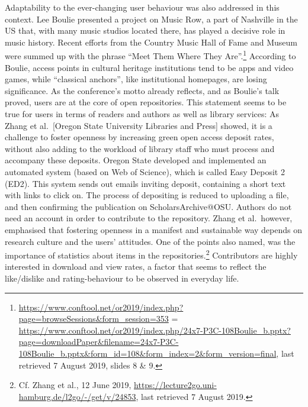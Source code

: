 \documentclass[a4paper,
fontsize=11pt,
oneside,
numbers=noperiodatend,
parskip=half-,
bibliography=totoc,
final
]{scrartcl}
\begin{document}
Adaptability to the ever-changing user behaviour was also addressed in
this context. Lee Boulie presented a project on Music Row, a part of
Nashville in the US that, with many music studios located there, has
played a decisive role in music history. Recent efforts from the Country
Music Hall of Fame and Museum were summed up with the phrase
\enquote{Meet Them Where They Are}.\footnote{\url{https://www.conftool.net/or2019/index.php?page=browseSessions&form_session=353} = \url{https://www.conftool.net/or2019/index.php/24x7-P3C-108Boulie_b.pptx?page=downloadPaper\&filename=24x7-P3C-108Boulie_b.pptx\&form_id=108\&form_index=2\&form_version=final}, last retrieved 7 August 2019, slides 8 \& 9.} According to Boulie,
access points in cultural heritage institutions tend to be apps and
video games, while \enquote{classical anchors}, like institutional
homepages, are losing significance. As the conference's motto already
reflects, and as Boulie's talk proved, users are at the core of open
repositories. This statement seems to be true for users in terms of
readers and authors as well as library services: As Zhang et
al.~{[}Oregon State University Libraries and Press{]} showed, it is a
challenge to foster openness by increasing green open access deposit
rates, without also adding to the workload of library staff who must
process and accompany these deposits. Oregon State developed and
implemented an automated system (based on Web of Science), which is
called Easy Deposit 2 (ED2). This system sends out emails inviting
deposit, containing a short text with links to click on. The process of
depositing is reduced to uploading a file, and then confirming the
publication on ScholarsArchive@OSU. Authors do not need an account in
order to contribute to the repository. Zhang et al.~however, emphasised
that fostering openness in a manifest and sustainable way depends on
research culture and the users' attitudes. One of the points also named,
was the importance of statistics about items in the
repositories.\footnote{Cf. Zhang et al., 12 June 2019,
  \url{https://lecture2go.uni-hamburg.de/l2go/-/get/v/24853}, last
  retrieved 7 August 2019.} Contributors are highly interested in
download and view rates, a factor that seems to reflect the like/dislike
and rating-behaviour to be observed in everyday life.
\end{document}
